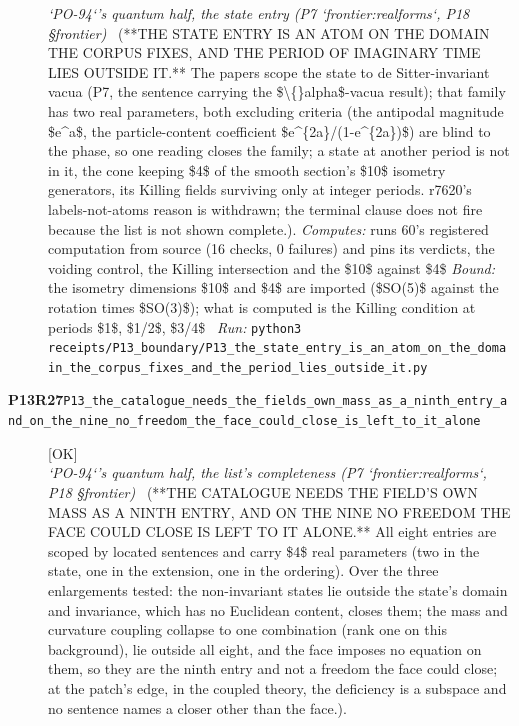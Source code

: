 \begin{description}
\textit{`PO-94`'s quantum half, the state entry (P7 `frontier:realforms`, P18 \S{}frontier)} \ (**THE STATE ENTRY IS AN ATOM ON THE DOMAIN THE CORPUS FIXES, AND THE PERIOD OF IMAGINARY TIME LIES OUTSIDE IT.** The papers scope the state to de Sitter-invariant vacua (P7, the sentence carrying the \$\textbackslash\{\}alpha\$-vacua result); that family has two real parameters, both excluding criteria (the antipodal magnitude \$e\textasciicircum{}a\$, the particle-content coefficient \$e\textasciicircum{}\{2a\}/(1-e\textasciicircum{}\{2a\})\$) are blind to the phase, so one reading closes the family; a state at another period is not in it, the cone keeping \$4\$ of the smooth section's \$10\$ isometry generators, its Killing fields surviving only at integer periods. r7620's labels-not-atoms reason is withdrawn; the terminal clause does not fire because the list is not shown complete.). 
\emph{Computes:} runs 60's registered computation from source (16 checks, 0 failures) and pins its verdicts, the voiding control, the Killing intersection and the \$10\$ against \$4\$
 \emph{Bound:} the isometry dimensions \$10\$ and \$4\$ are imported (\$SO(5)\$ against the rotation times \$SO(3)\$); what is computed is the Killing condition at periods \$1\$, \$1/2\$, \$3/4\$
\ \emph{Run:} \texttt{python3 receipts/P13\_boundary/P13\_the\_state\_entry\_is\_an\_atom\_on\_the\_domain\_the\_corpus\_fixes\_and\_the\_period\_lies\_outside\_it.py}
\item[\rcptlabel{P13_the_catalogue_needs_the_fields_own_mass_as_a_ninth_entry_and_on_the_nine_no_freedom_the_face_could_close_is_left_to_it_alone}{P13R27}\textbf{P13R27}\quad\texttt{P13\_the\_catalogue\_needs\_the\_fields\_own\_mass\_as\_a\_ninth\_entry\_and\_on\_the\_nine\_no\_freedom\_the\_face\_could\_close\_is\_left\_to\_it\_alone}]\hfill\textsf{[OK]}\\
\textit{`PO-94`'s quantum half, the list's completeness (P7 `frontier:realforms`, P18 \S{}frontier)} \ (**THE CATALOGUE NEEDS THE FIELD'S OWN MASS AS A NINTH ENTRY, AND ON THE NINE NO FREEDOM THE FACE COULD CLOSE IS LEFT TO IT ALONE.** All eight entries are scoped by located sentences and carry \$4\$ real parameters (two in the state, one in the extension, one in the ordering). Over the three enlargements tested: the non-invariant states lie outside the state's domain and invariance, which has no Euclidean content, closes them; the mass and curvature coupling collapse to one combination (rank one on this background), lie outside all eight, and the face imposes no equation on them, so they are the ninth entry and not a freedom the face could close; at the patch's edge, in the coupled theory, the deficiency is a subspace and no sentence names a closer other than the face.). 

\end{description}
